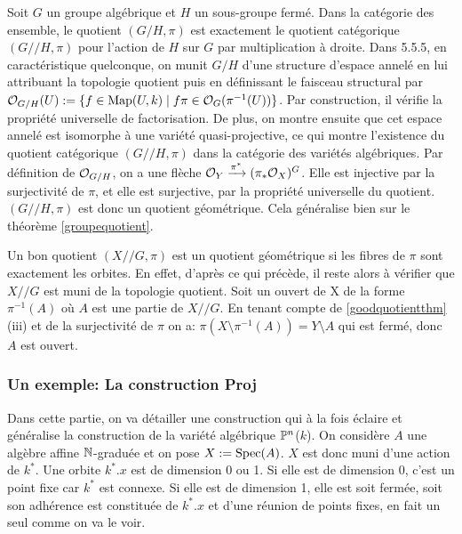 \begin{ex}\label{groupQuotientGeometrique}
Soit $G$ un groupe algébrique et $H$ un sous-groupe fermé. Dans la catégorie des ensemble, le quotient $(G/H,\pi)$ est exactement le quotient catégorique $(G//H,\pi)$ pour l'action de $H$ sur $G$ par multiplication à droite. Dans \cite{LAGSpringer} 5.5.5, en caractéristique quelconque, on munit $G/H$ d'une structure d'espace annelé en lui attribuant la topologie quotient puis en définissant le faisceau structural par $\mathcal{O}_{G/H}(U):=\lbrace f\in\textrm{Map}(U,k)\mid f\pi \in \mathcal{O}_G(\pi^{-1}(U))\rbrace$. Par construction, il vérifie la propriété universelle de factorisation. De plus, on montre ensuite que cet espace annelé est isomorphe à une variété quasi-projective, ce qui montre l'existence du quotient catégorique $(G//H,\pi)$ dans la catégorie des variétés algébriques. Par définition de $\mathcal{O}_{G/H}$, on a une flèche $\mathcal{O}_Y \xrightarrow{\pi^*} (\pi_*\mathcal{O}_X)^G$. Elle est injective par la surjectivité de $\pi$, et elle est surjective, par la propriété universelle du quotient. $(G//H,\pi)$ est donc un quotient géométrique. Cela généralise bien sur le théorème \ref{groupequotient}.
\end{ex}

\begin{ex}
Un bon quotient $(X//G, \pi)$ est un quotient géométrique si les fibres de $\pi$ sont exactement les orbites. En effet, d'après ce qui précède, il reste alors à vérifier que $X//G$ est muni de la topologie quotient. Soit un ouvert de X de la forme $\pi^{-1}(A)$ où $A$ est une partie de $X//G$. En tenant compte de \ref{goodquotientthm} (iii) et de la surjectivité de $\pi$ on a: $\pi(X\setminus \pi^{-1}(A))=Y\setminus A$ qui est fermé, donc $A$ est ouvert.
\end{ex}

\subsubsection{Un exemple: La construction Proj}
Dans cette partie, on va détailler une construction qui à la fois éclaire et généralise la construction de la variété algébrique $\mathbb{P}^n$($k$). On considère $A$ une algèbre affine $\mathbb{N}$-graduée et on pose $X:=\operatorname{Spec}(A)$. $X$ est donc muni d'une action de $k^*$. Une orbite $k^*.x$ est de dimension 0 ou 1. Si elle est de dimension 0, c'est un point fixe car $k^*$ est connexe. Si elle est de dimension 1, elle est soit fermée, soit son adhérence est constituée de $k^*.x$  et d'une réunion de points fixes, en fait un seul comme on va le voir.

